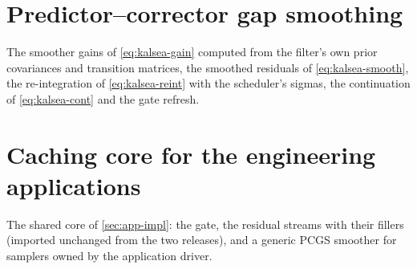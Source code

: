 

\section{Predictor--corrector gap smoothing}\label{sec:app-pcgs}
The smoother gains of \cref{eq:kalsea-gain} computed from the filter's own prior covariances and transition matrices, the smoothed residuals of \cref{eq:kalsea-smooth}, the re-integration of \cref{eq:kalsea-reint} with the scheduler's sigmas, the continuation of \cref{eq:kalsea-cont} and the gate refresh.



\section{Caching core for the engineering applications}\label{sec:app-core}
The shared core of \cref{sec:app-impl}: the gate, the residual streams with their fillers (imported unchanged from the two releases), and a generic PCGS smoother for samplers owned by the application driver.


